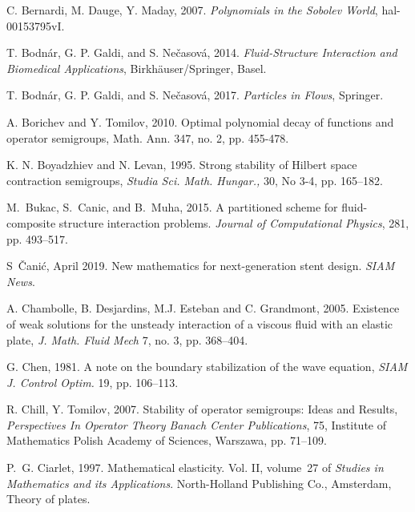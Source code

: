 \documentclass[11pt]{article}
\begin{document}
\begin{thebibliography}{99}

 C. Bernardi, M. Dauge, Y. Maday, 2007.  {\em Polynomials in the Sobolev World}, hal-00153795vI.

 T. Bodn{\'a}r, G. P. Galdi, and S. Ne{\v{c}}asov{\'a}, 2014.
 {\em Fluid-Structure Interaction and Biomedical Applications}, \newblock Birkh{\"a}user/Springer, Basel. \newblock

 T. Bodn{\'a}r, G. P. Galdi,
and S. Ne{\v{c}}asov{\'a}, 2017.  {\em Particles in Flows}, Springer.

 A. Borichev and Y. Tomilov, 2010. Optimal
polynomial decay of functions and operator semigroups,
Math. Ann. 347, no. 2, pp. 455-478.

 K. N. Boyadzhiev and N. Levan, 1995. Strong stability of Hilbert space contraction semigroups, \emph{Studia Sci. Math. Hungar.,} 30, No 3-4, pp. 165--182.

 M.~Bukac, S.~Canic, and B.~Muha, 2015. A
partitioned scheme for fluid-composite structure interaction  problems. %
 {\em Journal of Computational Physics}, 281, pp. 493--517.

 S~{\v C}ani{\' c},  April 2019. New mathematics for
next-generation stent design.  {\em SIAM News}.

 A. Chambolle, B. Desjardins, M.J. Esteban and C.
Grandmont, 2005. Existence of weak solutions for the unsteady interaction of a
viscous fluid with an elastic plate, \textit{J. Math. Fluid Mech }7,
no. 3, pp. 368--404.

 G. Chen, 1981.  A note on the boundary stabilization of the wave
equation, \textit{SIAM J. Control Optim.} 19, pp. 106--113.

 R. Chill, Y. Tomilov, 2007. Stability of operator semigroups:
Ideas and Results, \emph{Perspectives In Operator Theory Banach Center
Publications}, 75, Institute of Mathematics Polish Academy of Sciences,
Warszawa, pp. 71--109.

 P.~G. Ciarlet, 1997. Mathematical
elasticity. {V}ol. {II}, volume~27 of \emph{Studies  in Mathematics and its
Applications}.  North-Holland Publishing Co., Amsterdam, Theory of plates.


\end{thebibliography}
\end{document}
